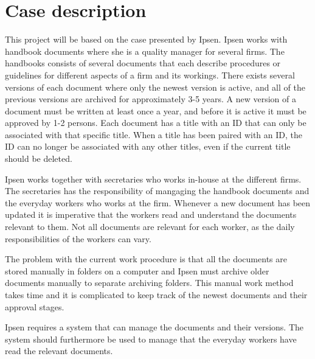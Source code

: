 \section{Case description} \label{case}

This project will be based on the case presented by Ipsen.
Ipsen works with handbook documents where she is a quality manager for several firms.
The handbooks consists of several documents that each describe procedures or guidelines for different aspects of a firm and its workings.
There exists several versions of each document where only the newest version is active, and all of the previous versions are archived for approximately 3-5 years.
A new version of a document must be written at least once a year, and before it is active it must be approved by 1-2 persons.
Each document has a title with an ID that can only be associated with that specific title. 
When a title has been paired with an ID, the ID can no longer be associated with any other titles, even if the current title should be deleted.

Ipsen works together with secretaries who works in-house at the different firms.
The secretaries has the responsibility of mangaging the handbook documents and the everyday workers who works at the firm.
Whenever a new document has been updated it is imperative that the workers read and understand the documents relevant to them.
Not all documents are relevant for each worker, as the daily responsibilities of the workers can vary.

The problem with the current work procedure is that all the documents are stored manually in folders on a computer and Ipsen must archive older documents manually to separate archiving folders.
This manual work method takes time and it is complicated to keep track of the newest documents and their approval stages.

Ipsen requires a system that can manage the documents and their versions.
The system should furthermore be used to manage that the everyday workers have read the relevant documents.
